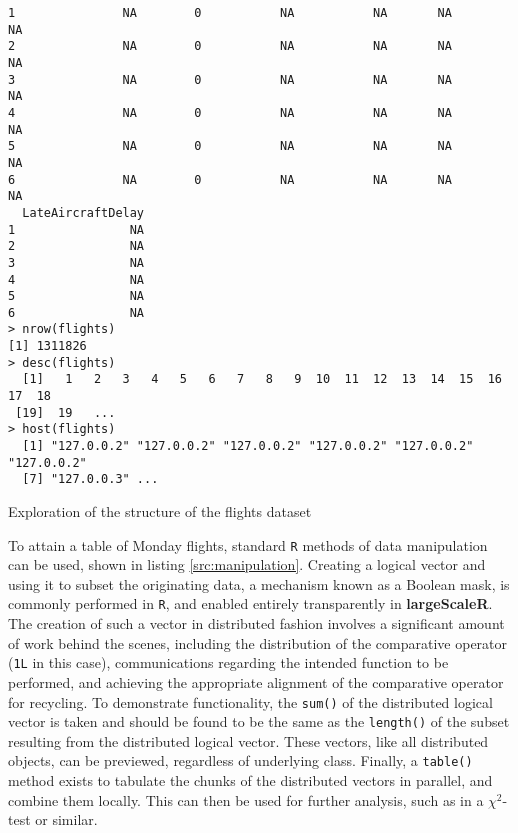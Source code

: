 \begin{listing}
\begin{verbatim}
1               NA        0           NA           NA       NA            NA
2               NA        0           NA           NA       NA            NA
3               NA        0           NA           NA       NA            NA
4               NA        0           NA           NA       NA            NA
5               NA        0           NA           NA       NA            NA
6               NA        0           NA           NA       NA            NA
  LateAircraftDelay
1                NA
2                NA
3                NA
4                NA
5                NA
6                NA
> nrow(flights)
[1] 1311826
> desc(flights)
  [1]   1   2   3   4   5   6   7   8   9  10  11  12  13  14  15  16  17  18
 [19]  19   ...
> host(flights)
  [1] "127.0.0.2" "127.0.0.2" "127.0.0.2" "127.0.0.2" "127.0.0.2" "127.0.0.2"
  [7] "127.0.0.3" ...
\end{verbatim}
\caption{Exploration of the structure of the flights dataset}\label{src:flights-structure}
\end{listing}

To attain a table of Monday flights, standard \texttt{R} methods of data manipulation can be used, shown in listing \ref{src:manipulation}.
Creating a logical vector and using it to subset the originating data, a mechanism known as a Boolean mask, is commonly performed in \texttt{R}, and enabled entirely transparently in \textbf{largeScaleR}.
The creation of such a vector in distributed fashion involves a significant amount of work behind the scenes, including the distribution of the comparative operator (\texttt{1L} in this case), communications regarding the intended function to be performed, and achieving the appropriate alignment of the comparative operator for recycling.
To demonstrate functionality, the \texttt{sum()} of the distributed logical vector is taken and should be found to be the same as the \texttt{length()} of the subset resulting from the distributed logical vector.
These vectors, like all distributed objects, can be previewed, regardless of underlying class.
Finally, a \texttt{table()} method exists to tabulate the chunks of the distributed vectors in parallel, and combine them locally.
This can then be used for further analysis, such as in a \(\chi^2\)-test or similar.

